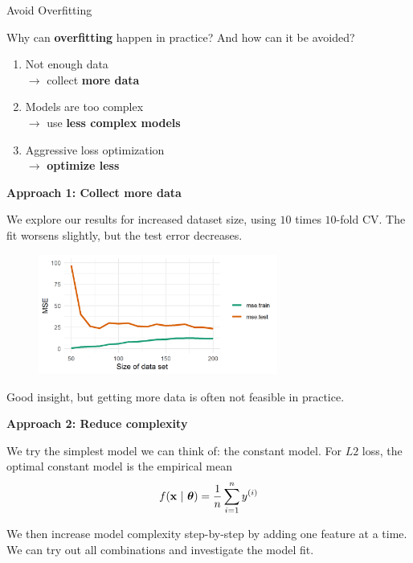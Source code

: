 \documentclass[11pt,compress,t,notes=noshow, xcolor=table]{beamer}
\begin{document}
\begin{vbframe}{Avoid Overfitting} 

Why can \textbf{overfitting} happen in practice? And how can it be avoided?
\lz
\lz
\begin{enumerate}
\item Not enough data \\
$\to$ collect \textbf{more data} 
\item Models are too complex \\
$\to$ use \textbf{less complex models}
\item Aggressive loss optimization \\
$\to$ \textbf{optimize less}
\end{enumerate}


\framebreak 

\textbf{Approach 1: Collect more data}

\lz 

We explore our results for increased dataset size, using $10$ times $10$-fold CV.
The fit worsens slightly, but the test error decreases.

\begin{figure}
\includegraphics[width=0.7\textwidth]{figure/avoid_overfitting_01.png}\\
\end{figure}

Good insight, but getting more data is often not feasible in practice.

\framebreak

\textbf{Approach 2: Reduce complexity}


We try the simplest model we can think of: the constant model. For $L2$ loss, the optimal constant model is the empirical mean {\small $$f(\mathbf{x} ~|~ \bm{\theta}) = \frac{1}{n}\sum_{i=1}^n y^{(i)}$$}

We then increase model complexity step-by-step by adding one feature at a time. We can try out all combinations and investigate the model fit.



\end{vbframe}
\end{document}
